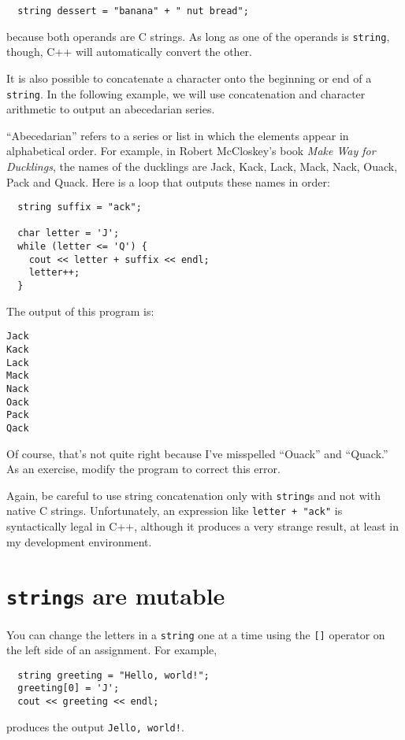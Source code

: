 \begin{verbatim}
  string dessert = "banana" + " nut bread";
\end{verbatim}
%
because both operands are C strings.  As long as one of the
operands is  {\tt string}, though, C++ will automatically
convert the other.

It is also possible to concatenate a character onto the
beginning or end of a {\tt string}.  In the following example, we
will use concatenation and character arithmetic to output
an abecedarian series.

``Abecedarian'' refers to a series or list in which the elements
appear in alphabetical order.  For example, in Robert McCloskey's book
{\em Make Way for Ducklings}, the names of the ducklings are Jack,
Kack, Lack, Mack, Nack, Ouack, Pack and Quack.  Here is a loop that
outputs these names in order:

\begin{verbatim}
  string suffix = "ack";

  char letter = 'J';
  while (letter <= 'Q') {
    cout << letter + suffix << endl;
    letter++;
  }
\end{verbatim}
%
The output of this program is:

\begin{verbatim}
Jack
Kack
Lack
Mack
Nack
Oack
Pack
Qack
\end{verbatim}
%
Of course, that's not quite right because I've misspelled ``Ouack''
and ``Quack.''  As an exercise, modify the program to correct
this error.

Again, be careful to use string concatenation only with {\tt string}s
and not with native C strings.  Unfortunately, an expression like
{\tt letter + "ack"} is syntactically legal in C++, although it
produces a very strange result, at least in my development environment.

\section{{\tt string}s are mutable}

You can change the letters in a {\tt string} one at a time
using the {\tt []} operator on the left side of an assignment.
For example,

\begin{verbatim}
  string greeting = "Hello, world!";
  greeting[0] = 'J';
  cout << greeting << endl;
\end{verbatim}
%
produces the output {\tt Jello, world!}.


